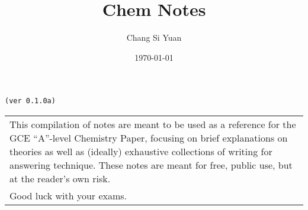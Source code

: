 \documentclass[../main]{subfiles}
\begin{document}
\author{Chang Si Yuan}
\title{Chem Notes}
\date{\today}

\maketitle

\begin{center}

	\texttt{(ver 0.1.0a)}

	\vspace{50pt}

	\begin{tabular}{>{\flushleft}p{8cm}}
	This compilation of notes are meant to be used as a reference for the GCE ``A''-level Chemistry Paper, focusing on brief explanations on theories as well as (ideally) exhaustive collections of writing for answering technique. These notes are meant for free, public use, but at the reader's own risk. \\
	Good luck with your exams.
	\end{tabular}

\end{center}

\newpage
\end{document}
